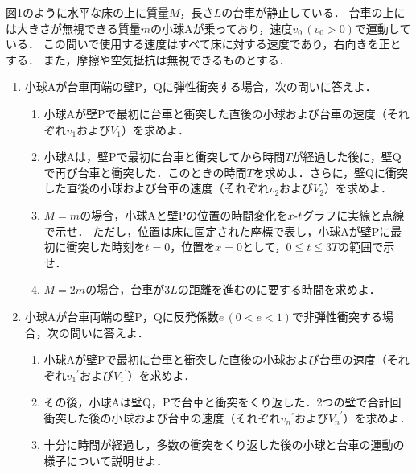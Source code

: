 

図1のように水平な床の上に質量$M$，長さ$L$の台車が静止している．
台車の上には大きさが無視できる質量$m$の小球Aが乗っており，速度$v_0\,(v_0>0)$で運動している．
この問いで使用する速度はすべて床に対する速度であり，右向きを正とする．
また，摩擦や空気抵抗は無視できるものとする．

\begin{enumerate}[（1）]
  \setlength{\leftskip}{-1.5zw}
  \setlength{\itemindent}{1zw}\setlength{\labelsep}{0.5zw}
  \setlength{\labelwidth}{1zw}\setlength{\leftmargin}{1zw}
  \setlength{\itemsep}{0.5\baselineskip}
  \item 小球Aが台車両端の壁P，Qに弾性衝突する場合，次の問いに答えよ．
  \begin{enumerate}[（a）]
    \setlength{\leftskip}{-2.5zw}
    \setlength{\itemindent}{1zw}\setlength{\labelsep}{1zw}
    \setlength{\labelwidth}{1zw}
    \item 小球Aが壁Pで最初に台車と衝突した直後の小球および台車の速度（それぞれ$v_1$および$V_1$）を求めよ．
    \item 小球Aは，壁Pで最初に台車と衝突してから時間$T$が経過した後に，壁Qで再び台車と衝突した．このときの時間$T$を求めよ．さらに，壁Qに衝突した直後の小球および台車の速度（それぞれ$v_2$および$V_2$）を求めよ．
    \item $M=m$の場合，小球Aと壁Pの位置の時間変化を$x\mathchar`-t$グラフに実線と点線で示せ．
    ただし，位置は床に固定された座標\x で表し，小球Aが壁Pに最初に衝突した時刻を$t=0$，位置を$x=0$として，$0\leqq t\leqq 3T$の範囲で示せ．
    \item $M=2m$の場合，台車が$3L$の距離を進むのに要する時間を求めよ．
  \end{enumerate}
  \item 小球Aが台車両端の壁P，Qに反発係数$e\,(0<e<1)$で非弾性衝突する場合，次の問いに答えよ．
  \begin{enumerate}[（a）]
    \setlength{\leftskip}{-2.5zw}
    \setlength{\itemindent}{1zw}\setlength{\labelsep}{1zw}
    \setlength{\labelwidth}{1zw}
    \item 小球Aが壁Pで最初に台車と衝突した直後の小球および台車の速度（それぞれ${v_1}^\prime$および${V_1}^\prime$）を求めよ．
    \item その後，小球Aは壁Q，Pで台車と衝突をくり返した．2つの壁で合計\nn 回衝突した後の小球および台車の速度（それぞれ${v_n}^\prime$および${V_n}^\prime$）を求めよ．
    \item 十分に時間が経過し，多数の衝突をくり返した後の小球と台車の運動の様子について説明せよ．
  \end{enumerate}
\end{enumerate}


